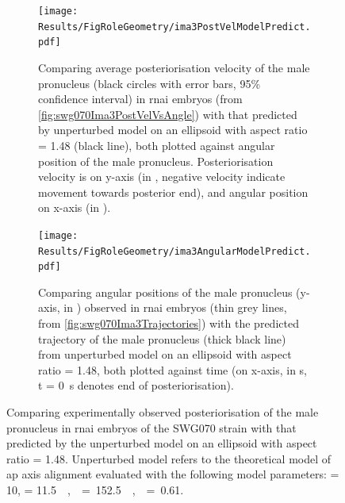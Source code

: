 \begin{figure}
    \centering
    \begin{subfigure}[t]{0.45\textwidth}
        \texttt{[image: Results/FigRoleGeometry/ima3PostVelModelPredict.pdf]}
        \caption{Comparing average posteriorisation velocity of the male pronucleus (black circles with error bars, \num{95}\% confidence interval) in  \ac{rnai} embryos (from \autoref{fig:swg070Ima3PostVelVsAngle}) with that predicted by unperturbed model on an ellipsoid with aspect ratio \aspectRatio = \num{1.48} (black line), both plotted against angular position of the male pronucleus. Posteriorisation velocity is on y-axis (in \si{\unitPostVel}, negative velocity indicate movement towards posterior end), and angular position on x-axis (in \si{\unitAngle}).}
        \label{subfig:ima3ModelCompareExpt-postVel}
    \end{subfigure}
    \hfill
    \begin{subfigure}[t]{0.45\textwidth}
        \texttt{[image: Results/FigRoleGeometry/ima3AngularModelPredict.pdf]}
        \caption{Comparing angular positions of the male pronucleus (y-axis, in \si{\unitAngle}) observed in  \ac{rnai} embryos (thin grey lines, from \autoref{fig:swg070Ima3Trajectories}) with the predicted trajectory of the male pronucleus (thick black line) from unperturbed model on an ellipsoid with aspect ratio \aspectRatio = \num{1.48}, both plotted against time (on x-axis, in \si{\second}, t = \SI{0}{\second} denotes end of posteriorisation).}
        \label{subfig:ima3ModelCompareExpt-tracks}
    \end{subfigure}
    \caption[Experimentally observed posteriorisation in  \acs{rnai} embryos compared with that predicted by theoretical model]{Comparing experimentally observed posteriorisation of the male pronucleus in  \ac{rnai} embryos of the SWG070 strain with that predicted by the unperturbed model on an ellipsoid with aspect ratio \aspectRatio = \num{1.48}. Unperturbed model refers to the theoretical model of \ac{ap} axis alignment evaluated with the following model parameters: \hydrodynamicLength = \SI{10}{\unitLength}, \activeRelaxLength = \SI{11.5}{\square\unitLength\per\second}, \nematicLength = \SI{152.5}{\square\unitLength\per\second}, \dragCoefficient = \num{0.61}.}
    \label{fig:ima3ModelCompareExpt}
\end{figure} 

